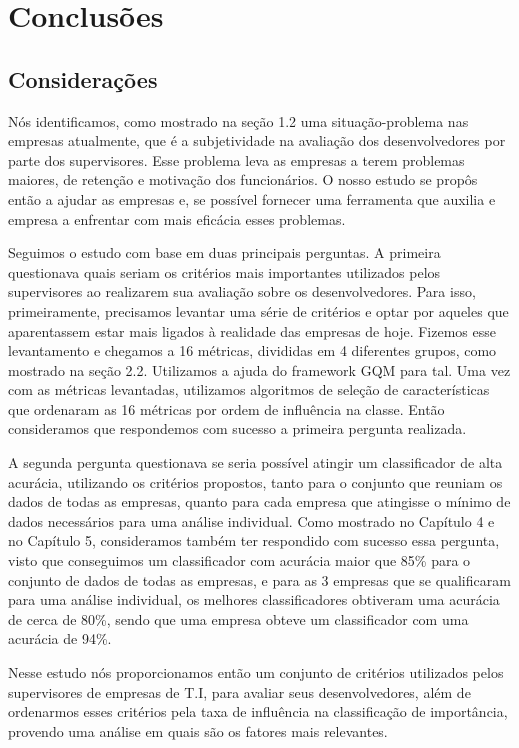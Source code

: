\chapter[Conclusões]{Conclusões}

\section{Considerações}
Nós identificamos, como mostrado na seção 1.2 uma situação-problema nas empresas atualmente, que é a subjetividade na avaliação dos desenvolvedores por parte dos supervisores. Esse problema leva as empresas a terem problemas maiores, de retenção e motivação dos funcionários. O nosso estudo se propôs então a ajudar as empresas e, se possível fornecer uma ferramenta que auxilia e empresa a enfrentar com mais eficácia esses problemas.

Seguimos o estudo com base em duas principais perguntas. A primeira questionava quais seriam os critérios mais importantes utilizados pelos supervisores ao realizarem sua avaliação sobre os desenvolvedores. Para isso, primeiramente, precisamos levantar uma série de critérios e optar por aqueles que aparentassem estar mais ligados à realidade das empresas de hoje. Fizemos esse levantamento e chegamos a 16 métricas, divididas em 4 diferentes grupos, como mostrado na seção 2.2. Utilizamos a ajuda do framework GQM para tal. Uma vez com as métricas levantadas, utilizamos algoritmos de seleção de características que ordenaram as 16 métricas por ordem de influência na classe. Então consideramos que respondemos com sucesso a primeira pergunta realizada.

A segunda pergunta questionava se seria possível atingir um classificador de alta acurácia, utilizando os critérios propostos, tanto para o conjunto que reuniam os dados de todas as empresas, quanto para cada empresa que atingisse o mínimo de dados necessários para uma análise individual. Como mostrado no Capítulo 4 e no Capítulo 5, consideramos também ter respondido com sucesso essa pergunta, visto que conseguimos um classificador com acurácia maior que 85\% para o conjunto de dados de todas as empresas, e para as 3 empresas que se qualificaram para uma análise individual, os melhores classificadores obtiveram uma acurácia de cerca de 80\%, sendo que uma empresa obteve um classificador com uma acurácia de 94\%.

Nesse estudo nós proporcionamos então um conjunto de critérios utilizados pelos supervisores de empresas de T.I, para avaliar seus desenvolvedores, além de ordenarmos esses critérios pela taxa de influência na classificação de importância, provendo uma análise em quais são os fatores mais relevantes.

